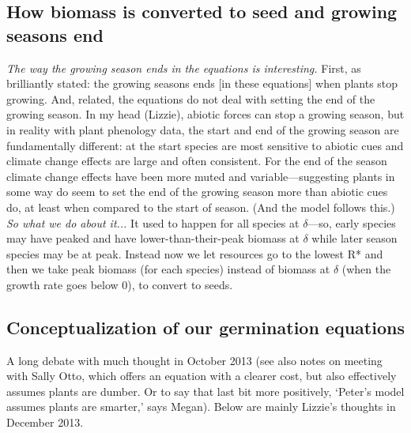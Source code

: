 \documentclass[11pt,a4paper,oneside]{article}
\begin{document}
\subsection{How biomass is converted to seed and growing seasons end}


\noindent \emph{The way the growing season ends in the equations is
interesting.} First, as brilliantly stated: the growing seasons ends
[in these equations] when plants stop growing. And, related, the
equations do not deal with setting the end of the growing season. In
my head (Lizzie), abiotic forces can stop a growing season, but in
reality with plant phenology data, the start and end of the growing
season are fundamentally different: at the start species are most
sensitive to abiotic cues and climate change effects are large and
often consistent. For the end of the season climate change effects have been more
muted and variable---suggesting plants in some way do seem to set the
end of the growing season more than abiotic cues do, at least when
compared to the start of season. (And the model follows this.)\\

\noindent \emph{So what we do about it...} It used to happen for all species at $\delta$---so, early species may have peaked and have lower-than-their-peak biomass at $\delta$ while later season species may be at peak. Instead now we let resources go to  the lowest R* and then we take peak biomass (for each species) instead of biomass at $\delta$ (when the growth rate goes below 0), to convert to seeds.


\subsection{Conceptualization of our germination equations}
\noindent A long debate with much thought in October 2013 (see also notes on meeting with Sally Otto, which offers an equation with a clearer cost, but also effectively assumes plants are dumber. Or to say that last bit more positively, `Peter's model assumes plants are smarter,' says Megan). Below are mainly Lizzie's thoughts in December 2013. \\
\end{document}

